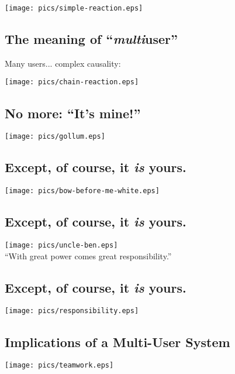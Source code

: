 \documentclass[xga]{xdvislides}
\begin{document}
\begin{center}
	\texttt{[image: pics/simple-reaction.eps]}
\end{center}

\subsection{The meaning of ``{\em multi}user''}
Many users... complex causality:

\begin{center}
	\texttt{[image: pics/chain-reaction.eps]}
\end{center}

\subsection{No more: ``It's mine!''}
\begin{center}
	\texttt{[image: pics/gollum.eps]}
\end{center}

\subsection{Except, of course, it {\em is} yours.}
\begin{center}
	\texttt{[image: pics/bow-before-me-white.eps]}
\end{center}

\subsection{Except, of course, it {\em is} yours.}
\begin{center}
	\texttt{[image: pics/uncle-ben.eps]} \\
	\addvspace{.2in}
	\Huge
	``With great power comes great responsibility.''
	\Normalsize
\end{center}

\subsection{Except, of course, it {\em is} yours.}
\begin{center}
	\texttt{[image: pics/responsibility.eps]}
\end{center}


\subsection{Implications of a Multi-User System}
\vspace*{\fill}
\begin{center}
	\texttt{[image: pics/teamwork.eps]}
\end{center}
\vspace*{\fill}
\end{document}
